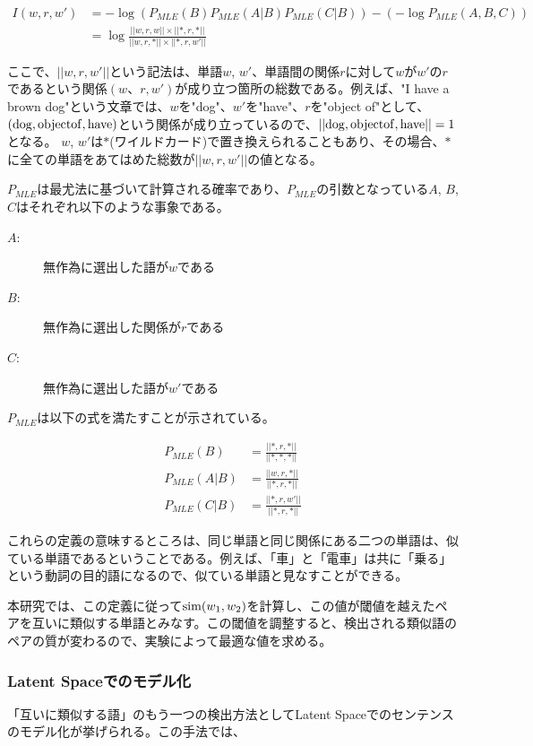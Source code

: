 \documentclass[12pt]{jarticle}
\begin{document}
\begin{align}
I(w, r, w') & = -\log(P_{MLE}(B)P_{MLE}(A|B)P_{MLE}(C|B))-(-\log P_{MLE}(A,B,C)) \\
 & = \log \frac{||w,r,w||\times||*,r,*||}{||w,r,*||\times||*,r,w'||}
\end{align}

ここで、$||w, r, w'||$という記法は、単語$w$, $w'$、単語間の関係$r$に対して$w$が$w'$の$r$であるという関係$(w、r, w')$が成り立つ箇所の総数である。例えば、"I have a brown dog"という文章では、$w$を"dog"、$w'$を"have"、$r$を"object of"として、$\rm (dog, objectof, have)$という関係が成り立っているので、$\rm||dog, object of, have||=1$となる。
$w$, $w'$は$*$(ワイルドカード)で置き換えられることもあり、その場合、$*$に全ての単語をあてはめた総数が$||w, r, w'||$の値となる。

$P_{MLE}$は最尤法に基づいて計算される確率であり、$P_{MLE}$の引数となっている$A$, $B$, $C$はそれぞれ以下のような事象である。

\begin{description}
  \item[$A$:]無作為に選出した語が$w$である
  \item[$B$:]無作為に選出した関係が$r$である
  \item[$C$:]無作為に選出した語が$w'$である
\end{description}

$P_{MLE}$は以下の式を満たすことが示されている。

\begin{align}
  P_{MLE}(B)   & = \frac{||*, r, *||}{||*, *, *||}\\
  P_{MLE}(A|B) & = \frac{||w, r, *||}{||*, r, *||}\\
  P_{MLE}(C|B) & = \frac{||*, r,w'||}{||*, r, *||}
\end{align}

これらの定義の意味するところは、同じ単語と同じ関係にある二つの単語は、似ている単語であるということである。例えば、「車」と「電車」は共に「乗る」という動詞の目的語になるので、似ている単語と見なすことができる。

本研究では、この定義に従って${\rm sim}(w_1, w_2)$を計算し、この値が閾値を越えたペアを互いに類似する単語とみなす。この閾値を調整すると、検出される類似語のペアの質が変わるので、実験によって最適な値を求める。

\subsubsection{Latent Spaceでのモデル化}
「互いに類似する語」のもう一つの検出方法としてLatent Spaceでのセンテンスのモデル化\cite{LatentSpace}が挙げられる。この手法では、
\end{document}
